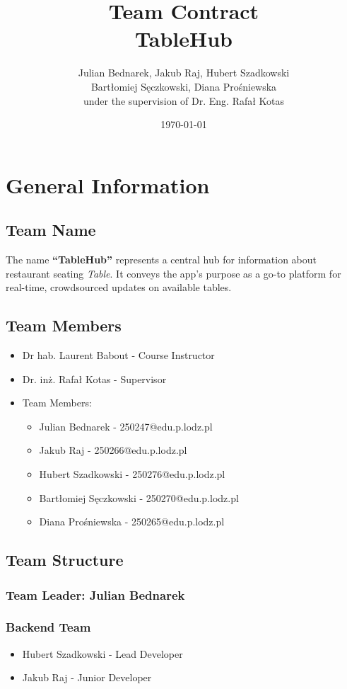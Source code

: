 \documentclass[12pt]{article}
\title{Team Contract \\ \vspace{0.25cm} \large TableHub}
\author{Julian Bednarek, Jakub Raj, Hubert Szadkowski \\ Bartłomiej Sęczkowski, Diana Prośniewska \\ under the supervision of Dr. Eng. Rafał Kotas}
\date{\monthyeardate\today}
\begin{document}
\maketitle
\thispagestyle{empty}
\newpage

\tableofcontents
\newpage

\section{General Information}
\subsection{Team Name}
The name \textbf{“TableHub”} represents a central hub for information about restaurant seating \textit{Table}. It conveys the app’s purpose as a go-to platform for real-time, crowdsourced updates on available tables.

\subsection{Team Members}
\begin{itemize}
    \item Dr hab. Laurent Babout - Course Instructor
    \item Dr. inż. Rafał Kotas - Supervisor
    \item Team Members:
    \begin{itemize}
        \item Julian Bednarek - 250247@edu.p.lodz.pl
        \item Jakub Raj - 250266@edu.p.lodz.pl
        \item Hubert Szadkowski - 250276@edu.p.lodz.pl
        \item Bartłomiej Sęczkowski - 250270@edu.p.lodz.pl
        \item Diana Prośniewska - 250265@edu.p.lodz.pl
    \end{itemize}
\end{itemize}
\subsection{Team Structure}
\subsubsection*{Team Leader: \textbf{Julian Bednarek}}
\subsubsection*{Backend Team}
\begin{itemize}
    \item Hubert Szadkowski - Lead Developer
    \item Jakub Raj - Junior Developer
\end{itemize}
\end{document}
